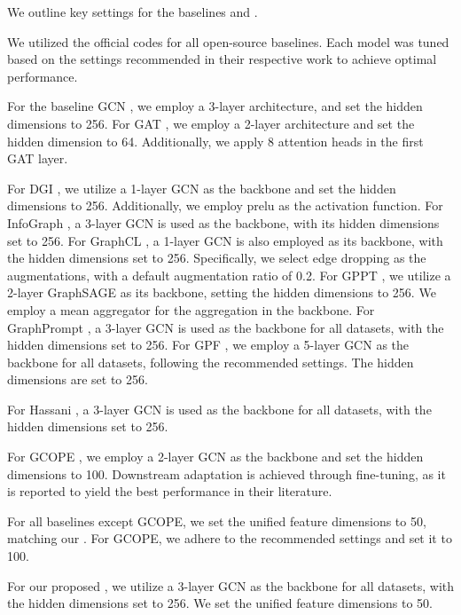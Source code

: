 We outline key settings for the baselines and \model. 

We utilized the official codes for all open-source baselines. Each model was tuned based on the settings recommended in their respective work to achieve optimal performance.

For the baseline GCN \cite{kipf2016semi}, we employ a 3-layer architecture, and set the hidden dimensions to 256. 
For GAT \cite{velivckovic2017graph}, we employ a 2-layer architecture and set the hidden dimension to 64. Additionally, we apply 8 attention heads in the first GAT layer.

For DGI \cite{velivckovic2017graph}, we utilize a 1-layer GCN as the backbone and set the hidden dimensions to 256. Additionally, we employ prelu as the activation function.
For InfoGraph \cite{sun2019infograph}, a 3-layer GCN is used as the backbone, with its hidden dimensions set to 256.
For GraphCL \cite{you2020graph}, a 1-layer GCN is also employed as its backbone, with the hidden dimensions set to 256. Specifically, we select edge dropping as the augmentations, with a default augmentation ratio of 0.2.
For GPPT \cite{sun2022gppt}, we utilize a 2-layer GraphSAGE as its backbone, setting the hidden dimensions to 256. We employ a mean aggregator for the aggregation in the backbone.
For GraphPrompt \cite{liu2023graphprompt}, a 3-layer GCN is used as the backbone for all datasets, with the hidden dimensions set to 256.
For GPF \cite{fang2022universal}, we employ a 5-layer GCN as the backbone for all datasets, following the recommended settings. The hidden dimensions are set to 256.


For Hassani \cite{hassani2022cross}, a 3-layer GCN is used as the backbone for all datasets, with the hidden dimensions set to 256.


For GCOPE \cite{zhao2024all}, we employ a 2-layer GCN as the backbone and set the hidden dimensions to 100. Downstream adaptation is achieved through fine-tuning, as it is reported to yield the best performance in their literature.

For all baselines except GCOPE, we set the unified feature dimensions to 50, matching our \model. For GCOPE, we adhere to the recommended settings and set it to 100.

For our proposed \model, we utilize a 3-layer GCN as the backbone for all datasets, with the hidden dimensions set to 256. We set the unified feature dimensions to 50.

